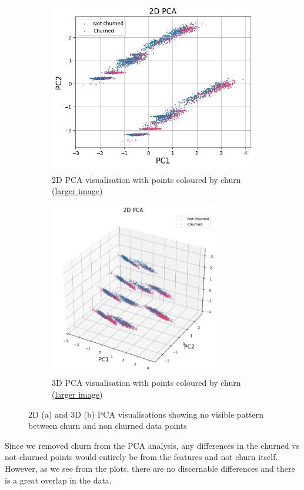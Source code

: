 \documentclass[]{article}
\begin{document}
\begin{figure}[h!]
	\centering
	\begin{subfigure}[t]{0.55\textwidth}
		\centering
		\includegraphics[height=3in]{2d}
		\caption{2D PCA visualisation with points coloured by churn (\href{https://github.com/ray33ee/Understanding-predicting-and-preventing-churn/blob/main/tex/2d.png?raw=true}{larger image})}
	\end{subfigure}
	\begin{subfigure}[t]{0.55\textwidth}
		\centering
		\includegraphics[height=3in]{3d}
		\caption{3D PCA visualisation with points coloured by churn (\href{https://github.com/ray33ee/Understanding-predicting-and-preventing-churn/blob/main/tex/3d.png?raw=true}{larger image})}
	\end{subfigure}
	\caption{2D (a) and 3D (b) PCA visualisations showing no visible pattern between churn and non churned data points}
\end{figure}

Since we removed churn from the PCA analysis, any differences in the churned vs not churned points would entirely be from the features and not churn itself. However, as we see from the plots, there are no discernable differences and there is a great overlap in the data. 
\end{document}

